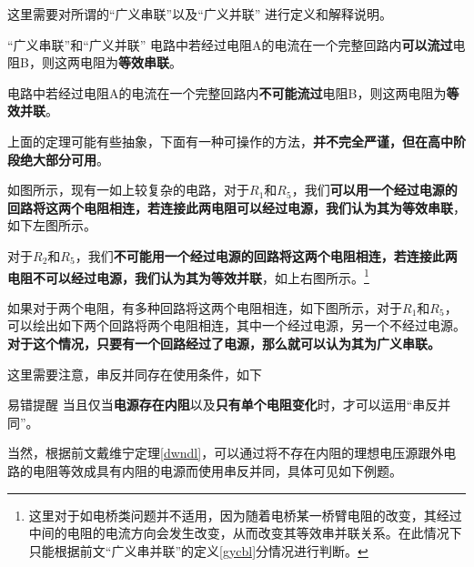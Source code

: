 这里需要对所谓的“广义串联”以及“广义并联” 进行定义和解释说明。

\begin{defi}[label=gycbl]{“广义串联”和“广义并联”}{}
电路中若经过电阻A的电流在一个完整回路内\textbf{可以流过}电阻B，则这两电阻为\textbf{等效串联}。

电路中若经过电阻A的电流在一个完整回路内\textbf{不可能流过}电阻B，则这两电阻为\textbf{等效并联}。
\end{defi}

上面的定理可能有些抽象，下面有一种可操作的方法，\textbf{并不完全严谨，但在高中阶段绝大部分可用}。



如图所示，现有一如上较复杂的电路，对于$R_1$和$R_5$，我们\textbf{可以用一个经过电源的回路将这两个电阻相连，若连接此两电阻可以经过电源，我们认为其为等效串联}，如下左图所示。

\begin{minipage}[b]{0.45\linewidth}

\end{minipage}
\hfill
\begin{minipage}[b]{0.45\linewidth}

\end{minipage}

对于$R_2$和$R_5$，我们\textbf{不可能用一个经过电源的回路将这两个电阻相连，若连接此两电阻不可以经过电源，我们认为其为等效并联}，如上右图所示。\footnote{这里对于如电桥类问题并不适用，因为随着电桥某一桥臂电阻的改变，其经过中间的电阻的电流方向会发生改变，从而改变其等效串并联关系。在此情况下只能根据前文“广义串并联”的定义\eqref{gycbl}分情况进行判断。}

如果对于两个电阻，有多种回路将这两个电阻相连，如下图所示，对于$R_1$和$R_5$，可以绘出如下两个回路将两个电阻相连，其中一个经过电源，另一个不经过电源。\textbf{对于这个情况，只要有一个回路经过了电源，那么就可以认为其为广义串联。}



这里需要注意，串反并同存在使用条件，如下

\begin{mk}{易错提醒}{}
当且仅当\textbf{电源存在内阻}以及\textbf{只有单个电阻变化}时，才可以运用“串反并同”。
\end{mk}

当然，根据前文戴维宁定理\eqref{dwndl}，可以通过将不存在内阻的理想电压源跟外电路的电阻等效成具有内阻的电源而使用串反并同，具体可见如下例题。

